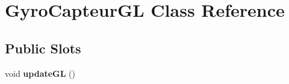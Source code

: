 \hypertarget{class_gyro_capteur_g_l}{\section{Gyro\-Capteur\-G\-L Class Reference}
\label{class_gyro_capteur_g_l}
}
\subsection*{Public Slots}
\begin{DoxyCompactItemize}
\item 
\hypertarget{class_gyro_capteur_g_l_a5414fa0a7c1a55c6e00023bf573d90ff}{void {\bfseries update\-G\-L} ()}\label{class_gyro_capteur_g_l_a5414fa0a7c1a55c6e00023bf573d90ff}

\end{DoxyCompactItemize}
